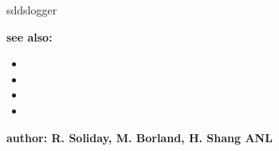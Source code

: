 \begin{sddsprog}{sddslogger}
\item {\bf see also:}
    \begin{itemize}
%
%
    \item {}
    \item {}
    \item {}
    \item {}
    \end{itemize}
%
%
\item {\bf author: R. Soliday, M. Borland, H. Shang ANL} 
\end{sddsprog}
